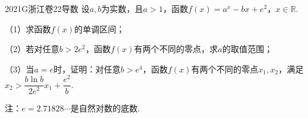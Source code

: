 
\begin{problem}{2021}{G}{浙江卷}{22}{导数}
设$a,b$为实数，且$a>1$，函数$f(x)=a^x -bx +e^2$，$x\in\mathbb{R}$.

（1）求函数$f(x)$的单调区间；

（2）若对任意$b>2e^2$，函数$f(x)$有两个不同的零点，求$a$的取值范围；

（3）当$a=e$时，证明：对任意$b>e^4$，函数$f(x)$有两个不同的零点$x_1,x_2$，满足$x_2> \dfrac{b\ln b}{2e^2} x_1 + \dfrac{e^2}{b}$.

注：$e=2.71828\cdots$是自然对数的底数.
\end{problem}